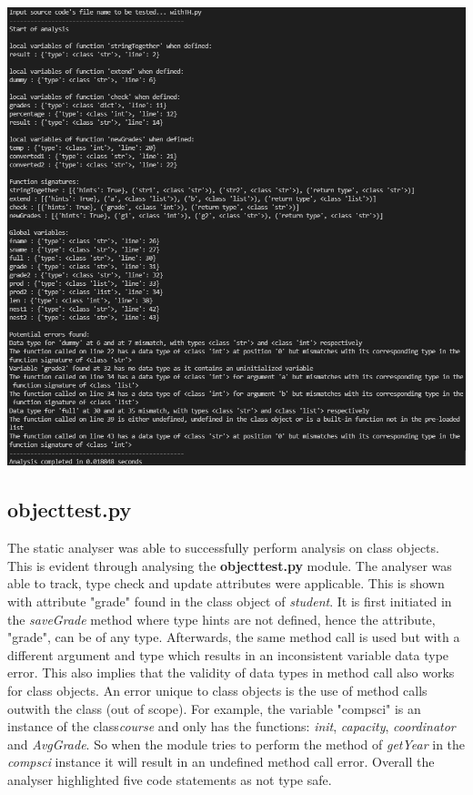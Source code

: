 \documentclass{l4proj}
\begin{document}
\begin{center}
    \includegraphics[width=\textwidth]{images/withTH.png}
    \label{fig:withTH}
\end{center}

\subsection{object\textunderscore test.py}
The static analyser was able to successfully perform analysis on class objects. This is evident through analysing the \textbf{object\textunderscore test.py} module. The analyser was able to track, type check and update attributes were applicable. This is shown with attribute "grade" found in the class object of \textit{student}. It is first initiated in the \textit{saveGrade} method where type hints are not defined, hence the attribute, "grade", can be of any type. Afterwards, the same method call is used but with a different argument and type which results in an inconsistent variable data type error. This also implies that the validity of data types in method call also works for class objects. An error unique to class objects is the use of method calls outwith the class (out of scope). For example, the variable "compsci" is an instance of the class\textit{course} and only has the functions: \textit{init}, \textit{capacity}, \textit{coordinator} and \textit{AvgGrade}. So when the module tries to perform the method of \textit{getYear} in the \textit{compsci} instance it will result in an undefined method call error. Overall the analyser highlighted five code statements as not type safe.
\end{document}
